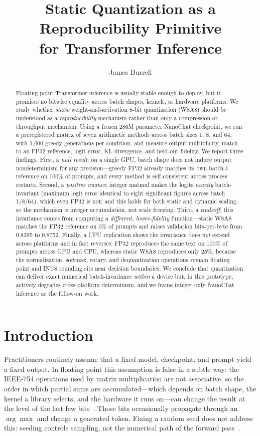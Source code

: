 \documentclass[10pt,twocolumn]{article}
\title{\vspace{-1.5em}Static Quantization as a Reproducibility Primitive\\ for Transformer Inference}
\author[1]{James Burrell}
\affil[1]{\normalsize Columbia University \quad \texttt{jjb2271@columbia.edu}}
\date{}
\begin{document}
\maketitle

\begin{abstract}
Floating-point Transformer inference is usually stable enough to deploy, but it
promises no bitwise equality across batch shapes, kernels, or hardware
platforms. We study whether \emph{static} weight-and-activation 8-bit
quantization (W8A8) should be understood as a \emph{reproducibility} mechanism
rather than only a compression or throughput mechanism. Using a frozen 286M
parameter NanoChat checkpoint, we run a preregistered matrix of seven arithmetic
methods across batch sizes 1, 8, and 64, with 1{,}000 greedy generations per
condition, and measure output multiplicity, match to an FP32 reference, logit
error, KL divergence, and held-out fidelity. We report three findings. First, a
\emph{null result}: on a single GPU, batch shape does not induce output
nondeterminism for any precision---greedy FP32 already matches its own batch-1
reference on 100\% of prompts, and every method is self-consistent across
process restarts. Second, a \emph{positive nuance}: integer matmul makes the
logits \emph{exactly} batch-invariant (maximum logit error identical to eight
significant figures across batch 1/8/64), which even FP32 is not; and this holds
for both static and dynamic scaling, so the mechanism is integer accumulation,
not scale freezing. Third, a \emph{tradeoff}: this invariance comes from
computing a \emph{different, lower-fidelity} function---static W8A8 matches the
FP32 reference on 0\% of prompts and raises validation bits-per-byte from 0.8395
to 0.8752. Finally, a CPU replication shows the invariance does \emph{not} extend
across platforms and in fact reverses: FP32 reproduces the same text on 100\% of
prompts across GPU and CPU, whereas static W8A8 reproduces only 25\%, because the
normalization, softmax, rotary, and dequantization operations remain floating
point and INT8 rounding sits near decision boundaries. We conclude that
quantization can deliver exact numerical batch-invariance \emph{within} a device
but, in this prototype, actively degrades cross-platform determinism, and we frame
integer-only NanoChat inference as the follow-on work.
\end{abstract}

\section{Introduction}
Practitioners routinely assume that a fixed model, checkpoint, and prompt yield a
fixed output. In floating point this assumption is false in a subtle way: the
IEEE-754 operations used by matrix multiplication are not associative, so the
order in which partial sums are accumulated---which depends on batch shape, the
kernel a library selects, and the hardware it runs on---can change the result at
the level of the last few bits~\cite{pytorch_numerical}. Those bits occasionally
propagate through an $\arg\max$ and change a generated token. Fixing a random
seed does not address this: seeding controls sampling, not the numerical path of
the forward pass~\cite{pytorch_reproducibility,he2025nondeterminism}.
\end{document}
